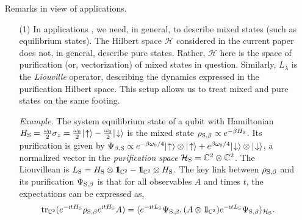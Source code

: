 \documentclass[letterpaper,onecolumn,11pt,accepted=2021-12-09]{quantumarticle}
\numberwithin{equation}{section}
\newcommand{\s}{{\rm S}}
\renewcommand{\i}{{\rm i}}
\newcommand{\bbbone}{\mathchoice {\rm 1\mskip-4mu l} {\rm 1\mskip-4mu l}
	{\rm 1\mskip-4.5mu l} {\rm 1\mskip-5mu l}}
\begin{document}
\begin{itemize}
\item[] Remarks	in view of applications.
\begin{itemize} 
\item[(1)] In applications \cite{Markov2,Mcorr}, we need, in general, to describe mixed states (such as equilibrium states). The Hilbert space $\mathcal H$ considered in the current paper does not, in general, describe pure states. Rather, $\mathcal H$ here is the space of purification (or, vectorization) of mixed states in question. Similarly, $L_\lambda$ is the {\em Liouville} operator, describing the dynamics expressed in the purification Hilbert space. This setup allows us to treat mixed and pure states on the same footing.
	
{\em Example. } The system equilibrium state of a qubit with Hamiltonian $H_\s=\tfrac{\omega_0}{2}\sigma_z =\tfrac{\omega_0}{2}|\!\uparrow\rangle -\tfrac{\omega_0}{2}|\!\downarrow\rangle$ is the mixed state $\rho_{\s,\beta}\propto e^{-\beta H_\s}$. Its purification is given by $\Psi_{\beta,\s}\propto e^{-\beta \omega_0/4} |
\!\uparrow\rangle\otimes|\!\uparrow\rangle +e^{\beta \omega_0/4} |
\!\downarrow\rangle\otimes|\!\downarrow\rangle$,  a normalized vector in the {\em purification space} ${\mathcal H}_\s={\mathbb C}^2\otimes{\mathbb C}^2$. 
The Liouvillean is $L_\s = H_\s\otimes\bbbone_{{\mathbb C}^2} - \bbbone_{{\mathbb C}^2}\otimes H_\s$. The key link between $\rho_{\s,\beta}$ and its purification $\Psi_{\s,\beta}$ is that for all observables $A$ and times $t$, the expectations can be expressed as,  
$$
{\rm tr}_{{\mathbb C^2}}(e^{-\i t H_\s}\rho_{\s,\beta}e^{\i t H_\s} A)=\langle e^{-\i t L_\s}\Psi_{\s,\beta}, (A\otimes \bbbone_{{\mathbb C^2}})e^{-\i t L_\s}\Psi_{\s,\beta}\rangle_{{\mathcal H}_\s}.
$$ 

\end{itemize}
\end{itemize}
\end{document}
